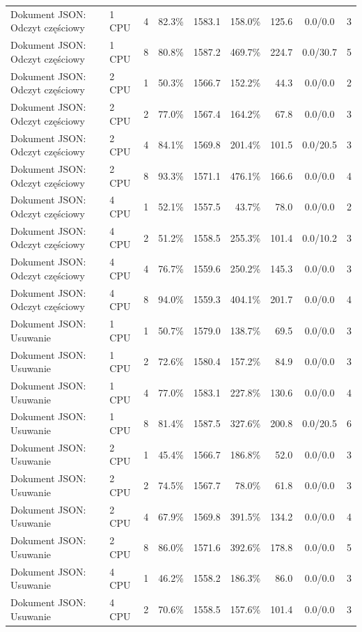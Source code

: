 \begin{table}[ht]
{\begin{tabular}{llcrrrrcc}
Dokument JSON: Odczyt częściowy & 1 CPU & 4 & 82.3\% & 1583.1 & 158.0\% & 125.6 & 0.0/0.0 & 3 \\
Dokument JSON: Odczyt częściowy & 1 CPU & 8 & 80.8\% & 1587.2 & 469.7\% & 224.7 & 0.0/30.7 & 5 \\
Dokument JSON: Odczyt częściowy & 2 CPU & 1 & 50.3\% & 1566.7 & 152.2\% & 44.3 & 0.0/0.0 & 2 \\
Dokument JSON: Odczyt częściowy & 2 CPU & 2 & 77.0\% & 1567.4 & 164.2\% & 67.8 & 0.0/0.0 & 3 \\
Dokument JSON: Odczyt częściowy & 2 CPU & 4 & 84.1\% & 1569.8 & 201.4\% & 101.5 & 0.0/20.5 & 3 \\
Dokument JSON: Odczyt częściowy & 2 CPU & 8 & 93.3\% & 1571.1 & 476.1\% & 166.6 & 0.0/0.0 & 4 \\
Dokument JSON: Odczyt częściowy & 4 CPU & 1 & 52.1\% & 1557.5 & 43.7\% & 78.0 & 0.0/0.0 & 2 \\
Dokument JSON: Odczyt częściowy & 4 CPU & 2 & 51.2\% & 1558.5 & 255.3\% & 101.4 & 0.0/10.2 & 3 \\
Dokument JSON: Odczyt częściowy & 4 CPU & 4 & 76.7\% & 1559.6 & 250.2\% & 145.3 & 0.0/0.0 & 3 \\
Dokument JSON: Odczyt częściowy & 4 CPU & 8 & 94.0\% & 1559.3 & 404.1\% & 201.7 & 0.0/0.0 & 4 \\
Dokument JSON: Usuwanie & 1 CPU & 1 & 50.7\% & 1579.0 & 138.7\% & 69.5 & 0.0/0.0 & 3 \\
Dokument JSON: Usuwanie & 1 CPU & 2 & 72.6\% & 1580.4 & 157.2\% & 84.9 & 0.0/0.0 & 3 \\
Dokument JSON: Usuwanie & 1 CPU & 4 & 77.0\% & 1583.1 & 227.8\% & 130.6 & 0.0/0.0 & 4 \\
Dokument JSON: Usuwanie & 1 CPU & 8 & 81.4\% & 1587.5 & 327.6\% & 200.8 & 0.0/20.5 & 6 \\
Dokument JSON: Usuwanie & 2 CPU & 1 & 45.4\% & 1566.7 & 186.8\% & 52.0 & 0.0/0.0 & 3 \\
Dokument JSON: Usuwanie & 2 CPU & 2 & 74.5\% & 1567.7 & 78.0\% & 61.8 & 0.0/0.0 & 3 \\
Dokument JSON: Usuwanie & 2 CPU & 4 & 67.9\% & 1569.8 & 391.5\% & 134.2 & 0.0/0.0 & 4 \\
Dokument JSON: Usuwanie & 2 CPU & 8 & 86.0\% & 1571.6 & 392.6\% & 178.8 & 0.0/0.0 & 5 \\
Dokument JSON: Usuwanie & 4 CPU & 1 & 46.2\% & 1558.2 & 186.3\% & 86.0 & 0.0/0.0 & 3 \\
Dokument JSON: Usuwanie & 4 CPU & 2 & 70.6\% & 1558.5 & 157.6\% & 101.4 & 0.0/0.0 & 3 \\

\end{tabular}}
\end{table}
